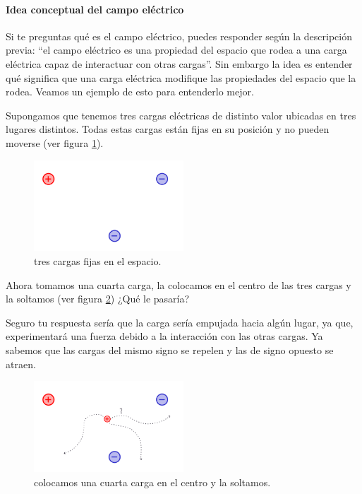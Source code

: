 \paragraph{Idea conceptual del campo eléctrico}

Si te preguntas qué es el campo eléctrico, puedes responder según la descripción previa: ``el campo eléctrico es una propiedad del espacio que rodea a una carga eléctrica capaz de interactuar con otras cargas''. Sin embargo la idea es entender qué significa que una carga eléctrica modifique las propiedades del espacio que la rodea. Veamos un ejemplo de esto para entenderlo mejor.

Supongamos que tenemos tres cargas eléctricas de distinto valor ubicadas en tres lugares distintos. Todas estas cargas están fijas en su posición y no pueden moverse (ver figura \ref{fig:campo_electrico_ejemplo_1}). 

\begin{figure}[ht]
    \centering
    \includegraphics[width=0.5\textwidth]{images/field_ex_1.png}
    \caption{tres cargas fijas en el espacio.}
    \label{fig:campo_electrico_ejemplo_1}
\end{figure}

Ahora tomamos una cuarta carga, la colocamos en el centro de las tres cargas y la soltamos (ver figura \ref{fig:campo_electrico_ejemplo_2}) ¿Qué le pasaría? 

Seguro tu respuesta sería que la carga sería empujada hacia algún lugar, ya que, experimentará una fuerza debido a la interacción con las otras cargas. Ya sabemos que las cargas del mismo signo se repelen y las de signo opuesto se atraen.

\begin{figure}[ht]
    \centering
    \includegraphics[width=0.5\textwidth]{images/field_ex_2.png}
    \caption{colocamos una cuarta carga en el centro y la soltamos.}
    \label{fig:campo_electrico_ejemplo_2}
\end{figure}

